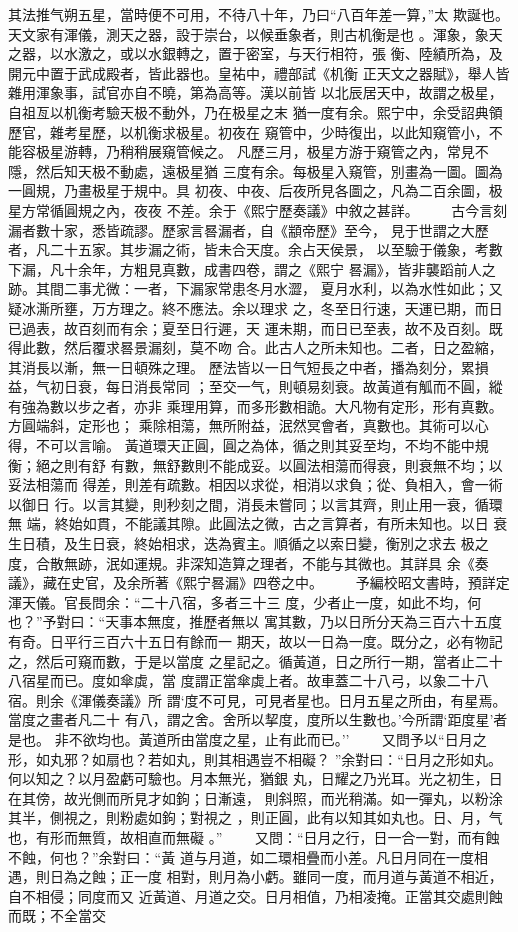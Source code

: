 \documentclass{ctexart}
\begin{document}
其法推气朔五星，當時便不可用，不待八十年，乃曰``八百年差一算，''太 欺誕也。天文家有渾儀，測天之器，設于崇台，以候垂象者，則古机衡是也 。渾象，象天之器，以水激之，或以水銀轉之，置于密室，与天行相符，張 衡、陸績所為，及開元中置于武成殿者，皆此器也。皇祐中，禮部試《机衡 正天文之器賦》，舉人皆雜用渾象事，試官亦自不曉，第為高等。漢以前皆 以北辰居天中，故謂之极星，自祖亙以机衡考驗天极不動外，乃在极星之末 猶一度有余。熙宁中，余受詔典領歷官，雜考星歷，以机衡求极星。初夜在 窺管中，少時復出，以此知窺管小，不能容极星游轉，乃稍稍展窺管候之。 凡歷三月，极星方游于窺管之內，常見不隱，然后知天极不動處，遠极星猶 三度有余。每极星入窺管，別畫為一圖。圖為一圓規，乃畫极星于規中。具 初夜、中夜、后夜所見各圖之，凡為二百余圖，极星方常循圓規之內，夜夜 不差。余于《熙宁歷奏議》中敘之甚詳。 　　古今言刻漏者數十家，悉皆疏謬。歷家言晷漏者，自《顓帝歷》至今， 見于世謂之大歷者，凡二十五家。其步漏之術，皆未合天度。余占天侯景， 以至驗于儀象，考數下漏，凡十余年，方粗見真數，成書四卷，謂之《熙宁 晷漏》，皆非襲蹈前人之跡。其間二事尤微：一者，下漏家常患冬月水澀， 夏月水利，以為水性如此；又疑冰澌所壅，万方理之。終不應法。余以理求 之，冬至日行速，天運已期，而日已過表，故百刻而有余；夏至日行遲，天 運未期，而日已至表，故不及百刻。既得此數，然后覆求晷景漏刻，莫不吻 合。此古人之所未知也。二者，日之盈縮，其消長以漸，無一日頓殊之理。 歷法皆以一日气短長之中者，播為刻分，累損益，气初日衰，每日消長常同 ；至交一气，則頓易刻衰。故黃道有觚而不圓，縱有強為數以步之者，亦非 乘理用算，而多形數相詭。大凡物有定形，形有真數。方圓端斜，定形也； 乘除相蕩，無所附益，泯然冥會者，真數也。其術可以心得，不可以言喻。 黃道環天正圓，圓之為体，循之則其妥至均，不均不能中規衡；絕之則有舒 有數，無舒數則不能成妥。以圓法相蕩而得衰，則衰無不均；以妥法相蕩而 得差，則差有疏數。相因以求從，相消以求負；從、負相入，會一術以御日 行。以言其變，則秒刻之間，消長未嘗同；以言其齊，則止用一衰，循環無 端，終始如貫，不能議其隙。此圓法之微，古之言算者，有所未知也。以日 衰生日積，及生日衰，終始相求，迭為賓主。順循之以索日變，衡別之求去 极之度，合散無跡，泯如運規。非深知造算之理者，不能与其微也。其詳具 余《奏議》，藏在史官，及余所著《熙宁晷漏》四卷之中。 　　予編校昭文書時，預詳定渾天儀。官長問余：``二十八宿，多者三十三 度，少者止一度，如此不均，何也？''予對曰：``天事本無度，推歷者無以 寓其數，乃以日所分天為三百六十五度有奇。日平行三百六十五日有餘而一 期天，故以一日為一度。既分之，必有物記之，然后可窺而數，于是以當度 之星記之。循黃道，日之所行一期，當者止二十八宿星而已。度如傘虡，當 度謂正當傘虡上者。故車蓋二十八弓，以象二十八宿。則余《渾儀奏議》所 謂`度不可見，可見者星也。日月五星之所由，有星焉。當度之畫者凡二十 有八，謂之舍。舍所以挈度，度所以生數也。'今所謂`距度星'者是也。 非不欲均也。黃道所由當度之星，止有此而已。'' 　　又問予以``日月之形，如丸邪？如扇也？若如丸，則其相遇豈不相礙？ ''余對曰：``日月之形如丸。何以知之？以月盈虧可驗也。月本無光，猶銀 丸，日耀之乃光耳。光之初生，日在其傍，故光側而所見才如鉤；日漸遠， 則斜照，而光稍滿。如一彈丸，以粉涂其半，側視之，則粉處如鉤；對視之 ，則正圓，此有以知其如丸也。日、月，气也，有形而無質，故相直而無礙 。'' 　　又問：``日月之行，日一合一對，而有蝕不蝕，何也？''余對曰：``黃 道与月道，如二環相疊而小差。凡日月同在一度相遇，則日為之蝕；正一度 相對，則月為小虧。雖同一度，而月道与黃道不相近，自不相侵；同度而又 近黃道、月道之交。日月相值，乃相凌掩。正當其交處則蝕而既；不全當交 
\end{document}
